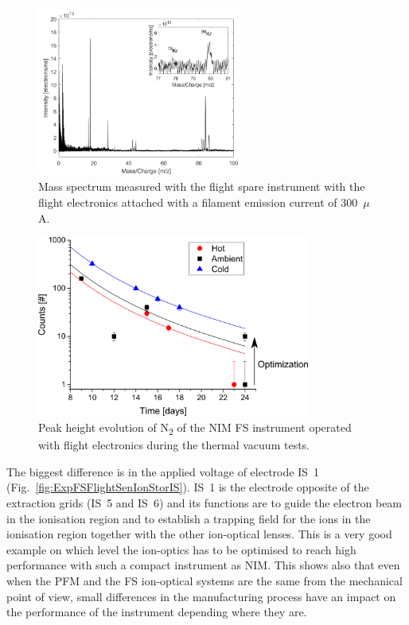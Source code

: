 		\begin{figure}[h!] %
			\centering
			\includegraphics[width = 0.6\textwidth]{Experiments/FS_thMode300uA.png}
			\caption{Mass spectrum measured with the flight spare instrument with the flight electronics attached with a filament emission current of 300~$\mu$A.}
			\label{fig:ExpFSFlightElK78}
		\end{figure}
		\begin{figure}[h!]
			\centering
			\includegraphics[width= 0.8\textwidth]{Experiments/TVT_SignalEvol.png}
			\caption{Peak height evolution of N\textsubscript{2} of the NIM FS instrument operated with flight electronics during the thermal vacuum tests.}
			\label{fig:expFSTVT}
		\end{figure}
		The biggest difference is in the applied voltage of electrode IS~1 (Fig.~\ref{fig:ExpFSFlightSenIonStorIS}). IS~1 is the electrode opposite of the extraction grids (IS~5 and IS~6) and its functions are to guide the electron beam in the ionisation region and to establish a trapping field for the ions in the ionisation region together with the other ion-optical lenses. This is a very good example on which level the ion-optics has to be optimised to reach high performance with such a compact instrument as NIM. This shows also that even when the PFM and the FS ion-optical systems are the same from the mechanical point of view, small differences in the manufacturing process have an impact on the performance of the instrument depending where they are.\\
